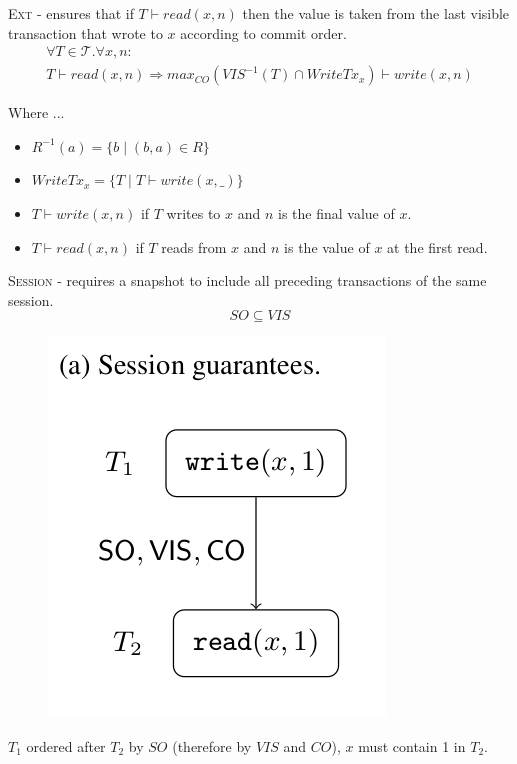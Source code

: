 \documentclass{beamer}
\begin{document}
\begin{frame}
	\begin{definition}
		\textsc{Ext} - ensures that if $T\vdash read(x,n)$ then the value is taken from the last visible transaction that wrote to $x$ according to commit order.
		\begin{multline*}
			\forall T \in \mathcal{T} . \forall x, n: \\
			T \vdash read(x,n) \Rightarrow
			max_{CO}\left( VIS^{-1}\left( T \right) \cap WriteTx_x \right) \vdash write(x,n)
		\end{multline*}
	\end{definition}
	Where ...
	\begin{itemize}
		\item $R^{-1}(a) = \{ b \mid (b, a) \in R \}$
		\item $ WriteTx_x = \{ T \mid T \vdash write(x,\_)\}$
		\item $ T \vdash write(x,n) $ if $T$ writes to $x$ and $n$ is the final value of $x$.
		\item $ T \vdash read(x,n)$ if $T$ reads from $x$ and $n$ is the value of $x$ at the first read.
	\end{itemize}
\end{frame}

\begin{frame}
	\begin{definition}
		\textsc{Session} - requires a snapshot to include all preceding transactions of the same session.
		$$ SO \subseteq VIS $$
	\end{definition}
\end{frame}

\begin{frame}
	\begin{figure}
		\includegraphics[scale=0.3]{fig2a}
	\end{figure}
	\begin{example}
		$T_1$ ordered after $T_2$ by $SO$ (therefore by $VIS$ and $CO$), $x$ must contain 1 in $T_2$.
	\end{example}
\end{frame}
\end{document}
